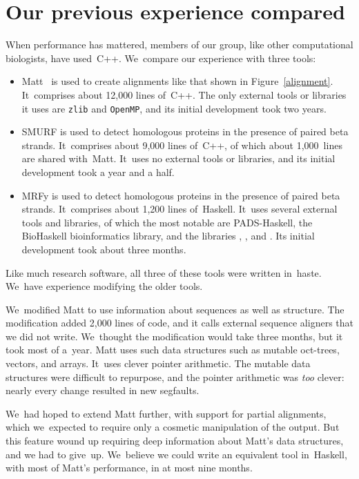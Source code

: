 \documentclass[preprint,nonatbib,blockstyle,nocopyrightspace,times]{sigplanconf}
\newcommand\figref[1]{Figure~\ref{#1}}
\newcommand\seclabel[1]{\label{sec:#1}}
\let\cite\citep
\begin{document}
 
 
\section{Our previous experience compared}
\seclabel{comparo}

When performance has mattered, members of our group, like other
computational biologists, have used~C++.
We~compare our experience with three tools:
\begin{itemize}
\item
Matt~\cite{Menke:2008wu} is used to create alignments like that shown
in \figref{alignment}.
It~comprises about 12,000 lines of~C++.
The only external tools or libraries it uses are \texttt{zlib}
and \texttt{OpenMP}, and its initial development took two years.
\item
SMURF
\cite{Menke:2010ti} is used to detect homologous proteins in the presence
of paired beta strands.
It~comprises about 9,000 lines of~C++, of which about 1,000~lines are
shared with~Matt.
It~uses no external tools or libraries, and
its initial development took a year and a half.
\item
MRFy is used to detect homologous proteins in the presence of paired
beta strands.
It~comprises about 1,200 lines of~Haskell.
It~uses several external tools and libraries, of which the most
notable are PADS-Haskell, the BioHaskell bioinformatics library, and
the libraries , ,
and .
Its initial development took about three months.
\end{itemize}
Like much research software, all three of these tools were written
 in~haste.
We~have experience modifying the older tools.



We~modified Matt to use information about sequences as well as structure.
The modification added 2,000 lines of code, and it calls
external sequence aligners that we did not write.
We~thought the modification would take three months, 
but it took most of a~year.
Matt uses such
data structures such as mutable oct-trees, vectors, and arrays.
It~uses clever pointer arithmetic.
The mutable data structures were difficult to 
repurpose, and the pointer arithmetic was \emph{too} clever: 
nearly every change resulted in new segfaults.

We~had hoped to extend Matt further, with support for partial alignments,
which we~expected to require only 
a cosmetic manipulation of the 
output.
But
this feature wound up
requiring deep information about Matt's data structures,
and we had to give~up.
We~believe we could write an equivalent tool in~Haskell,
with most of Matt's performance, in at most nine months.
\end{document}
